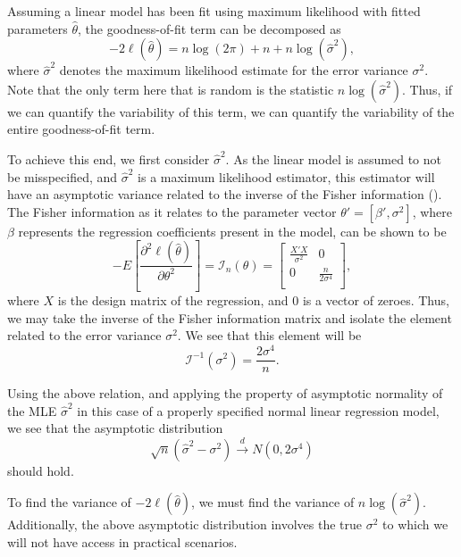 \documentclass[12pt]{article} %
\theoremstyle{definition}
\begin{document}
		Assuming a linear model has been fit using maximum likelihood with fitted parameters $\hat{\theta}$, the goodness-of-fit term can be decomposed as
		\begin{equation}
			-2 \ell (\hat{\theta}  ) = n \log(2 \pi) + n + n \log(\hat{\sigma}^2 ) ,
		\end{equation}
		where $\hat{\sigma}^2$ denotes the maximum likelihood estimate for the error variance $\sigma^2$. Note that the only term here that is random is
		the statistic $n \log(\hat{\sigma}^2)$. Thus, if we can quantify the variability of this term, we can quantify the variability of the entire goodness-of-fit
		term.

		To achieve this end, we first consider $\hat{\sigma}^2$. As the linear model is assumed to not be misspecified, and $\hat{\sigma}^2$ is a maximum likelihood
		estimator, this estimator will have an asymptotic variance related to the inverse of the Fisher information (\cite{Fisher}). The Fisher information as it relates
		to the parameter vector $\theta' = [\beta', \sigma^2]$, where $\beta$ represents the regression coefficients
		present in the model, can be shown to be
		\begin{equation*}
			- E \left[ \frac{\partial^2 \ell (\hat{\theta}  )}{\partial \theta^2} \right] = \mathcal{I}_{n}(\theta) =
			\begin{bmatrix}
				\frac{X' X}{\sigma^2} & 0 \\
				0 & \frac{n}{2 \sigma^4} \\
			\end{bmatrix}
			,
		\end{equation*}
		where $X$ is the design matrix of the regression, and $0$ is a vector of zeroes. Thus, we may take the inverse of the Fisher information matrix and isolate
		the element related to the error variance $\sigma^2$. We see that this element will be
		\begin{equation*}
			\mathcal{I}^{-1}(\sigma ^2) = \frac{2 \sigma ^4}{n} .
		\end{equation*}
		
		Using the above relation, and applying the property of asymptotic normality of the MLE $\hat{\sigma}^2$ in this case of a properly specified normal linear
		regression model, we see that the asymptotic distribution
		\begin{equation*}
			\sqrt{n} (\hat{\sigma}^2 - \sigma^2) \xrightarrow[]{d} N(0, 2 \sigma ^4 )
		\end{equation*}
		should hold.

		To find the variance of $-2 \ell (\hat{\theta}  )$, we must find the variance of $n \log(\hat{\sigma}^2)$.
		Additionally, the above asymptotic distribution involves the true $\sigma^2$ to which we will not have access in practical scenarios.
\end{document}
